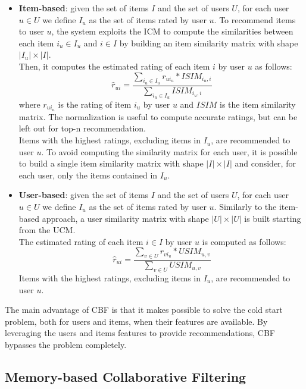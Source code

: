 \begin{itemize}

\item \textbf{Item-based}: given the set of items $I$ and the set of users $U$, for each user $u \in U$ we define $I_u$ as the set of items rated by user $u$. To recommend items to user $u$, the system exploits the ICM to compute the similarities between each item $i_u \in I_u$ and $i \in I$ by building an item similarity matrix with shape $|I_u| \times |I|$.\\
Then, it computes the estimated rating of each item $i$ by user $u$ as follows:
\[ \hat{r}_{ui} = \frac{\sum_{i_u \in I_u} r_{ui_u} * ISIM_{i_u,i}}{\sum_{i_u \in I_u} ISIM_{i_u,i}} \]
where $r_{ui_u}$ is the rating of item $i_u$ by user $u$ and $ISIM$ is the item similarity matrix. The normalization is useful to compute accurate ratings, but can be left out for top-n recommendation.\\
Items with the highest ratings, excluding items in $I_u$, are recommended to user $u$.
To avoid computing the similarity matrix for each user, it is possible to build a single item similarity matrix with shape $|I| \times |I|$ and consider, for each user, only the items contained in $I_u$.

\item \textbf{User-based}: given the set of items $I$ and the set of users $U$, for each user $u \in U$ we define $I_u$ as the set of items rated by user $u$. Similarly to the item-based approach, a user similarity matrix with shape $|U| \times |U|$ is built starting from the UCM.\\
The estimated rating of each item $i \in I$ by user $u$ is computed as follows:
\[ \hat{r}_{ui} = \frac{\sum_{v \in U} r_{vi_u} * USIM_{u,v}}{\sum_{v \in U} USIM_{u,v}} \]
Items with the highest ratings, excluding items in $I_u$, are recommended to user $u$.

\end{itemize}

The main advantage of CBF is that it makes possible to solve the cold start problem, both for users and items, when their features are available. By leveraging the users and items features to provide recommendations, CBF bypasses the problem completely.


\subsection{Memory-based Collaborative Filtering}

